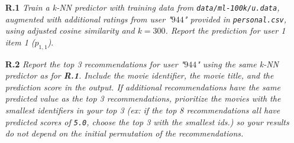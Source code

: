 \documentclass{article}
\begin{document}
\begin{itemize} 
   \item [\textbf{R.1}] \textit{Train a k-NN predictor with training data from \texttt{data/ml-100k/u.data}, augmented with additional ratings from user "$944$" provided in \texttt{personal.csv}, using adjusted cosine similarity and $k=300$. Report the prediction for user 1 item 1 ($p_{1,1}$)}.

  \item [\textbf{R.2}] \textit{Report the top 3 recommendations for user "$944$" using the same k-NN predictor as for \textbf{R.1}.  Include the movie identifier, the movie title, and the prediction score in the output. If additional recommendations have the same predicted value as the top 3 recommendations, prioritize the movies with the smallest identifiers in your top 3 (ex: if the top 8 recommendations all have predicted scores of \texttt{5.0}, choose the top 3 with the smallest ids.) so your results do not depend on the initial permutation of the recommendations.}
\end{itemize}
\end{document}
